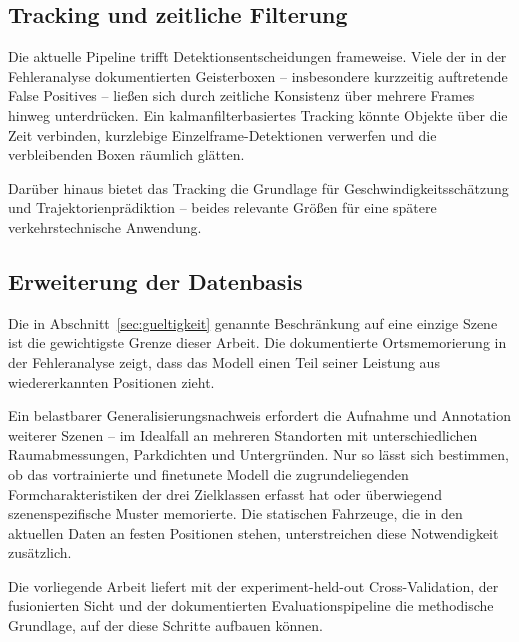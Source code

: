 \subsection{Tracking und zeitliche Filterung}

Die aktuelle Pipeline trifft Detektionsentscheidungen frameweise. Viele der in der Fehleranalyse dokumentierten Geisterboxen -- insbesondere kurzzeitig auftretende False Positives -- ließen sich durch zeitliche Konsistenz über mehrere Frames hinweg unterdrücken. Ein kalmanfilterbasiertes Tracking könnte Objekte über die Zeit verbinden, kurzlebige Einzelframe-Detektionen verwerfen und die verbleibenden Boxen räumlich glätten.

Darüber hinaus bietet das Tracking die Grundlage für Geschwindigkeitsschätzung und Trajektorienprädiktion -- beides relevante Größen für eine spätere verkehrstechnische Anwendung.

\subsection{Erweiterung der Datenbasis}

Die in Abschnitt~\ref{sec:gueltigkeit} genannte Beschränkung auf eine einzige Szene ist die gewichtigste Grenze dieser Arbeit. Die dokumentierte Ortsmemorierung in der Fehleranalyse zeigt, dass das Modell einen Teil seiner Leistung aus wiedererkannten Positionen zieht.

Ein belastbarer Generalisierungsnachweis erfordert die Aufnahme und Annotation weiterer Szenen -- im Idealfall an mehreren Standorten mit unterschiedlichen Raumabmessungen, Parkdichten und Untergründen. Nur so lässt sich bestimmen, ob das vortrainierte und finetunete Modell die zugrundeliegenden Formcharakteristiken der drei Zielklassen erfasst hat oder überwiegend szenenspezifische Muster memorierte. Die statischen Fahrzeuge, die in den aktuellen Daten an festen Positionen stehen, unterstreichen diese Notwendigkeit zusätzlich.

Die vorliegende Arbeit liefert mit der experiment-held-out Cross-Validation, der fusionierten Sicht und der dokumentierten Evaluationspipeline die methodische Grundlage, auf der diese Schritte aufbauen können.
